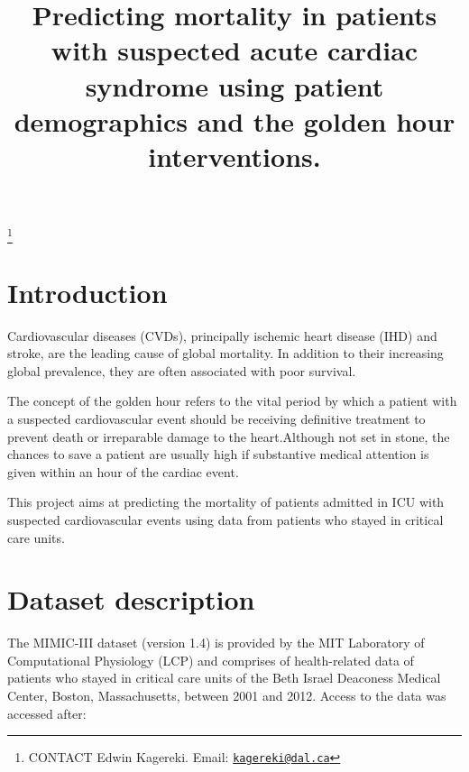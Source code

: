 \documentclass[]{interact}
\theoremstyle{plain}%
\theoremstyle{definition}
\theoremstyle{remark}
\begin{document}

\title{Predicting mortality in patients with suspected acute cardiac
syndrome using patient demographics and the golden hour interventions.}


\author{
\affil{$^{}$}
}

\thanks{CONTACT Edwin
Kagereki. Email: \href{mailto:kagereki@dal.ca}{\nolinkurl{kagereki@dal.ca}}}

\maketitle



\hypertarget{introduction}{%
\section{Introduction}\label{introduction}}

Cardiovascular diseases (CVDs), principally ischemic heart disease (IHD)
and stroke, are the leading cause of global mortality. In addition to
their increasing global prevalence, they are often associated with poor
survival. \citep{roth}

The concept of the golden hour refers to the vital period by which a
patient with a suspected cardiovascular event should be receiving
definitive treatment to prevent death or irreparable damage to the
heart.Although not set in stone, the chances to save a patient are
usually high if substantive medical attention is given within an hour of
the cardiac event\citep{Okada}.

This project aims at predicting the mortality of patients admitted in
ICU with suspected cardiovascular events using data from patients who
stayed in critical care units.

\hypertarget{dataset-description}{%
\section{Dataset description}\label{dataset-description}}

The MIMIC-III dataset (version 1.4)\citep{johnson} is provided by the
MIT Laboratory of Computational Physiology (LCP) and comprises of
health-related data of patients who stayed in critical care units of the
Beth Israel Deaconess Medical Center, Boston, Massachusetts, between
2001 and 2012. Access to the data was accessed after:
\end{document}
